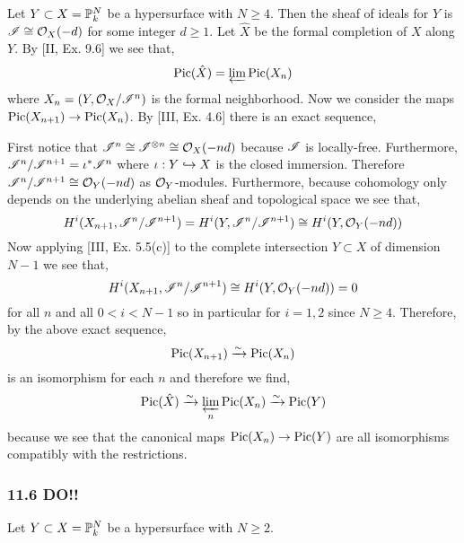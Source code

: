 \documentclass[12pt]{article}
\begin{document}
Let $Y \subset X = \P^N_k$ be a hypersurface with $N \ge 4$. Then the sheaf of ideals for $Y$ is $\I \cong \struct{X}(-d)$ for some integer $d \ge 1$. Let $\hat{X}$ be the formal completion of $X$ along $Y$. By [II, Ex. 9.6] we see that,
\[ \Pic{\hat{X}} = \varprojlim \Pic{X_n} \]
where $X_n = (Y, \struct{X} / \I^n)$ is the formal neighborhood. Now we consider the maps $\Pic{X_{n+1}} \to \Pic{X_n}$. By [III, Ex. 4.6] there is an exact sequence,
\begin{center}
\end{center}
First notice that $\I^n \cong \I^{\ot n} \cong \struct{X}(-nd)$ because $\I$ is locally-free. Furthermore, $\I^n / \I^{n+1} = \iota^* \I^n$ where $\iota : Y \embed X$ is the closed immersion. Therefore $\I^n / \I^{n+1} \cong \struct{Y}(-nd)$ as $\struct{Y}$-modules. Furthermore, because cohomology only depends on the underlying abelian sheaf and topological space we see that,
\[ H^i(X_{n+1}, \I^n / \I^{n+1}) = H^i(Y, \I^n / \I^{n+1}) \cong H^i(Y, \struct{Y}(-nd)) \]
Now applying [III, Ex. 5.5(c)] to the complete intersection $Y \subset X$ of dimension $N-1$ we see that,
\[  H^i(X_{n+1}, \I^n / \I^{n+1}) \cong H^i(Y, \struct{Y}(-nd)) = 0 \]
for all $n$ and all $0 < i < N - 1$ so in particular for $i = 1,2$ since $N \ge 4$. Therefore, by the above exact sequence,
\[ \Pic{X_{n+1}} \iso \Pic{X_n} \]
is an isomorphism for each $n$ and therefore we find,
\[ \Pic{\hat{X}} \iso \varprojlim_n \Pic{X_n} \iso \Pic{Y} \]
because we see that the canonical maps $\Pic{X_n} \to \Pic{Y}$ are all isomorphisms compatibly with the restrictions. 

\subsubsection{11.6 DO!!}

Let $Y \subset X = \P^N_k$ be a hypersurface with $N \ge 2$. 
\end{document}

